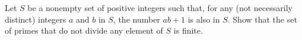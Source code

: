 Let $S$ be a nonempty set of positive integers such that, for any (not necessarily distinct) integers $a$ and $b$ in $S$, the number $ab+1$ is also in $S$. Show that the set of primes that do not divide any element of $S$ is finite.

